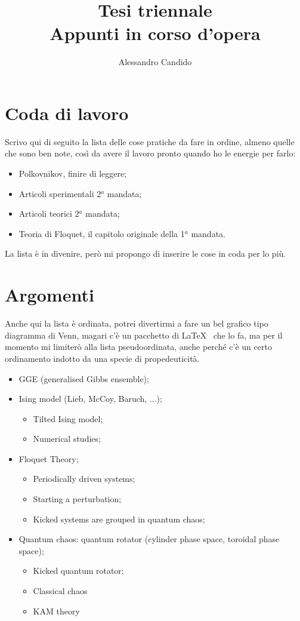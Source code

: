 \documentclass[a4paper,10pt]{article}
\title{Tesi triennale\\ Appunti in corso d'opera}
\author{Alessandro Candido}
\begin{document}
\maketitle

\section{Coda di lavoro}
Scrivo qui di seguito la lista delle cose pratiche da fare in ordine, almeno quelle che sono ben note, così da avere il lavoro pronto quando ho le energie per farlo:

\begin{itemize}
	\item Polkovnikov, finire di leggere;
	\item Articoli sperimentali 2$^a$ mandata;
	\item Articoli teorici 2$^a$ mandata;
	\item Teoria di Floquet, il capitolo originale della 1$^a$ mandata.
\end{itemize}

La lista è in divenire, però mi propongo di inserire le cose in coda per lo più.

\section{Argomenti}

Anche qui la lista è ordinata, potrei divertirmi a fare un bel grafico tipo diagramma di Venn, magari c'è un pacchetto di \LaTeX~ che lo fa, ma per il momento mi limiterò alla lista pseudoordinata, anche perché c'è un certo ordinamento indotto da una specie di propedeuticità.

\begin{itemize}
	\item GGE (generalised Gibbs ensemble);
	\item Ising model (Lieb, McCoy, Baruch, ...);
	\begin{itemize}
		\item Tilted Ising model;
		\item Numerical studies;
	\end{itemize}
	\item Floquet Theory;
	\begin{itemize}
		\item Periodically driven systems;
		\item Starting a perturbation;
		\item Kicked systems are grouped in quantum chaos;
	\end{itemize}
	\item Quantum chaos: quantum rotator (cylinder phase space, toroidal phase space);
	\begin{itemize}
		\item Kicked quantum rotator;
		\item Classical chaos
		\item KAM theory
	\end{itemize}
\end{itemize}
\end{document}
